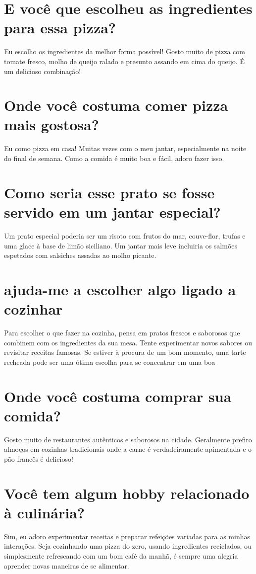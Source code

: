 \documentclass[11pt,a4paper]{article}
\begin{document}
\section{E você que escolheu as ingredientes para essa pizza?}
Eu escolho os ingredientes da melhor forma possível! Gosto muito de pizza com tomate fresco, molho de queijo ralado e presunto assando em cima do queijo. É um delicioso combinação!

\section{Onde você costuma comer pizza mais gostosa?}
Eu como pizza em casa! Muitas vezes com o meu jantar, especialmente na noite do final de semana. Como a comida é muito boa e fácil, adoro fazer isso.

\section{Como seria esse prato se fosse servido em um jantar especial?}
Um prato especial poderia ser um risoto com frutos do mar, couve-flor, trufas e uma glace à base de limão siciliano. Um jantar mais leve incluiria os salmões espetados com salsiches assadas ao molho picante.

\section{ajuda-me a escolher algo ligado a cozinhar}
Para escolher o que fazer na cozinha, pensa em pratos frescos e saborosos que combinem com os ingredientes da sua mesa. Tente experimentar novos sabores ou revisitar receitas famosas. Se estiver à procura de um bom momento, uma tarte recheada pode ser uma ótima escolha para se concentrar em uma boa

\section{Onde você costuma comprar sua comida?}
Gosto muito de restaurantes autênticos e saborosos na cidade. Geralmente prefiro almoços em cozinhas tradicionais onde a carne é verdadeiramente apimentada e o pão francês é delicioso!

\section{Você tem algum hobby relacionado à culinária?}
Sim, eu adoro experimentar receitas e preparar refeições variadas para as minhas interações. Seja cozinhando uma pizza do zero, usando ingredientes reciclados, ou simplesmente refrescando com um bom café da manhã, é sempre uma alegria aprender novas maneiras de se alimentar.
\end{document}
